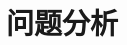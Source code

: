 \documentclass[12pt,a4paper]{article}
\newcommand{\prompt}[1]{\par\noindent\textbf{【写作提示】}#1\par}      %
\newcommand{\pitfall}[1]{\par\noindent\textbf{【容易失分】}#1\par}     %
\newcommand{\ph}[1]{\textbf{【#1】}}                                   %
\begin{document}






\section{问题分析}
\end{document}
